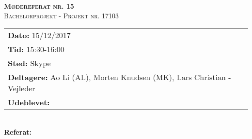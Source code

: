 
\newcommand{\HRule}{\rule{\linewidth}{0.1mm}}


	\begin{center}
		{\huge \bfseries \textsc{Mødereferat nr. 15}}\\
		\textsc{\large Bachelorprojekt - Projekt nr. 17103}\\[0.3cm]
	\end{center}
	\begin{tabular}{ll}
	\large \textbf{Dato:} 15/12/2017  	\\ %
	\large \textbf{Tid:}  15:30-16:00 	\\ %
	\large \textbf{Sted:} Skype		\\ %
	\large \textbf{Deltagere:} Ao Li (AL), Morten Knudsen (MK), Lars Christian - Vejleder \\
	\large \textbf{Udeblevet:} 
	\end{tabular}\\
	\phantom{\,}\hspace{0.1em} \large \textbf{Referat:}
